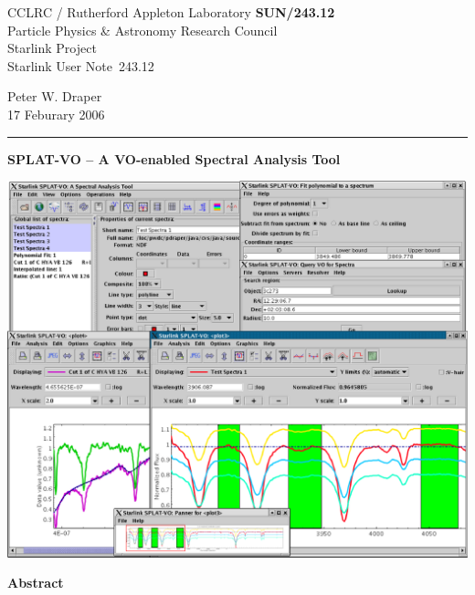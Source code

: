 \documentclass[twoside,11pt]{article}
\newcommand{\stardoccategory}  {Starlink User Note}
\newcommand{\stardocinitials}  {SUN}
\newcommand{\stardocnumber}    {243.12}
\newcommand{\stardocauthors}   {Peter W. Draper}
\newcommand{\stardocdate}      {17 Feburary 2006}
\newcommand{\stardoctitle}     {SPLAT-VO -- A VO-enabled Spectral Analysis Tool}
\newcommand{\stardocname}{\stardocinitials /\stardocnumber}
\newenvironment{latexonly}{}{}
\renewcommand{\_}{\texttt{\symbol{95}}}
\begin{document}
\thispagestyle{empty}

\begin{latexonly}
   CCLRC / Rutherford Appleton Laboratory \hfill \textbf{\stardocname}\\
   {\large Particle Physics \& Astronomy Research Council}\\
   {\large Starlink Project\\}
   {\large \stardoccategory\ \stardocnumber}
   \begin{flushright}
   \stardocauthors\\
   \stardocdate
   \end{flushright}
   \vspace{-4mm}
   \rule{\textwidth}{0.5mm}
   \vspace{5mm}
   \begin{center}
      {\LARGE\textbf{\stardoctitle \\ [2.5ex]}}
   \end{center}
   \vspace{5mm}

\begin{center}
\includegraphics[scale=0.4]{sun243_figures/frontfigure.eps}
\end{center}

   \begin{center}
      {\Large\textbf{Abstract}}
   \end{center}
\end{latexonly}
\end{document}
